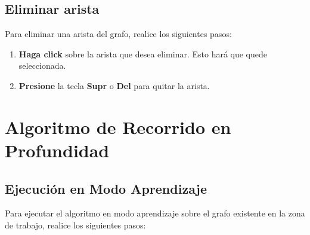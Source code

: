 \documentclass{book}
\begin{document}
\section{Eliminar arista}

Para eliminar una arista del grafo, realice los siguientes pasos:
\medskip

\begin{enumerate}
	\itemsep=8pt \topsep=0pt \partopsep=0pt \parskip=0pt \parsep=0pt

	\item \textbf{Haga click} sobre la arista que desea eliminar. Esto hará que quede seleccionada.

	\item \textbf{Presione} la tecla \textbf{Supr} o \textbf{Del} para quitar la arista.

\end{enumerate}
\medskip




%
%
\chapter{Algoritmo de Recorrido en Profundidad}


\section{Ejecución en Modo Aprendizaje}

Para ejecutar el algoritmo en modo aprendizaje sobre el grafo existente en la zona de trabajo, realice los siguientes pasos:
\medskip
\end{document}
